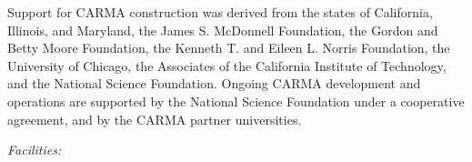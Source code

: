 \documentclass[apj]{emulateapj}
\begin{document}
\acknowledgments

Support for CARMA construction was derived from the states of California, Illinois, and
Maryland, the James S. McDonnell Foundation, the Gordon and Betty Moore Foundation, the
Kenneth T. and Eileen L. Norris Foundation, the University of Chicago, the Associates of the
California Institute of Technology, and the National Science Foundation. Ongoing CARMA
development and operations are supported by the National Science Foundation under a
cooperative agreement, and by the CARMA partner universities.

{\it Facilities:} 


\end{document}
